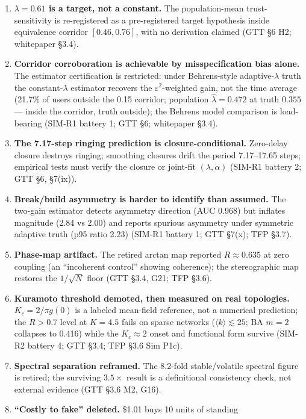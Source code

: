 \documentclass[11pt]{article}
\begin{document}
\begin{enumerate}
\item \textbf{$\lambda = 0.61$ is a target, not a constant.} The population-mean
trust-sensitivity is re-registered as a pre-registered target hypothesis inside
equivalence corridor $[0.46, 0.76]$, with no derivation claimed (GTT \S{}6 H2;
whitepaper \S{}3.4).
\item \textbf{Corridor corroboration is achievable by misspecification bias alone.}
The estimator certification is restricted: under Behrens-style adaptive-$\lambda$
truth the constant-$\lambda$ estimator recovers the $\varepsilon^2$-weighted gain,
not the time average (21.7\% of users outside the 0.15 corridor; population
$\hat{\lambda} = 0.472$ at truth $0.355$ --- inside the corridor, truth outside);
the Behrens model comparison is load-bearing (SIM-R1 battery 1; GTT \S{}6;
whitepaper \S{}3.4).
\item \textbf{The 7.17-step ringing prediction is closure-conditional.} Zero-delay
closure destroys ringing; smoothing closures drift the period 7.17--17.65 steps;
empirical tests must verify the closure or joint-fit $(\lambda, \alpha)$
(SIM-R1 battery 2; GTT \S{}6, \S{}7(ix)).
\item \textbf{Break/build asymmetry is harder to identify than assumed.} The
two-gain estimator detects asymmetry direction (AUC 0.968) but inflates magnitude
(2.84 vs 2.00) and reports spurious asymmetry under symmetric adaptive truth
(p95 ratio 2.23) (SIM-R1 battery 1; GTT \S{}7(x); TFP \S{}3.7).
\item \textbf{Phase-map artifact.} The retired arctan map reported $R \approx 0.635$
at zero coupling (an ``incoherent control'' showing coherence); the stereographic
map restores the $1/\sqrt{N}$ floor (GTT \S{}3.4, G21; TFP \S{}3.6).
\item \textbf{Kuramoto threshold demoted, then measured on real topologies.}
$K_c = 2/\pi g(0)$ is a labeled mean-field reference, not a numerical prediction;
the $R > 0.7$ level at $K = 4.5$ fails on sparse networks ($\langle k\rangle
\lesssim 25$; BA $m = 2$ collapses to 0.416) while the $K_c \approx 2$ onset and
functional form survive (SIM-R2 battery 4; GTT \S{}3.4; TFP \S{}3.6 Sim P1c).
\item \textbf{Spectral separation reframed.} The 8.2-fold stable/volatile spectral
figure is retired; the surviving $3.5\times$ result is a definitional consistency
check, not external evidence (GTT \S{}3.6 M2, G16).
\item \textbf{``Costly to fake'' deleted.} \$1.01 buys 10 units of standing

\end{enumerate}
\end{document}
